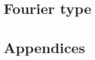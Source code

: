 \documentclass[a4paper,10pt,intlimits,sumlimits]{amsart}
\begin{document}
\section{Fourier type}
\label{sec:fouriertype}


\section{Appendices}
\label{sec:appendices}







\footnotesize

 
\end{document}
